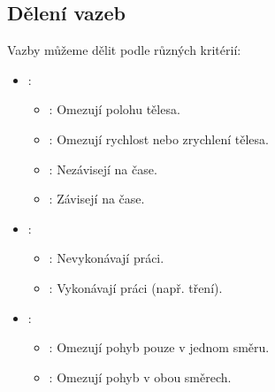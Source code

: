 \documentclass[letterpaper,10pt,english]{jupyterBook}
\begin{document}
\subsection{Dělení vazeb}
\label{\detokenize{Prednasky/1_1_Stupe_u0148_volnosti:deleni-vazeb}}
\sphinxAtStartPar
Vazby můžeme dělit podle různých kritérií:
\begin{itemize}
\item {} 
\sphinxAtStartPar
{}:
\begin{itemize}
\item {} 
\sphinxAtStartPar
{}: Omezují polohu tělesa.

\item {} 
\sphinxAtStartPar
{}: Omezují rychlost nebo zrychlení tělesa.

\item {} 
\sphinxAtStartPar
{}: Nezávisejí na čase.

\item {} 
\sphinxAtStartPar
{}: Závisejí na čase.

\end{itemize}

\item {} 
\sphinxAtStartPar
{}:
\begin{itemize}
\item {} 
\sphinxAtStartPar
{}: Nevykonávají práci.

\item {} 
\sphinxAtStartPar
{}: Vykonávají práci (např. tření).

\end{itemize}

\item {} 
\sphinxAtStartPar
{}:
\begin{itemize}
\item {} 
\sphinxAtStartPar
{}: Omezují pohyb pouze v jednom směru.

\item {} 
\sphinxAtStartPar
{}: Omezují pohyb v obou směrech.

\end{itemize}

\end{itemize}
\end{document}
